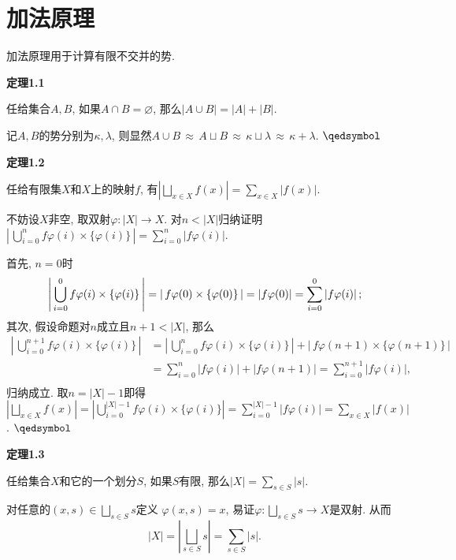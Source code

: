 \documentclass[UTF8]{ctexart}
\begin{document}
\setlength{\abovedisplayskip}{1pt}
\setlength{\belowdisplayskip}{1pt}

\section{加法原理}

加法原理用于计算有限不交并的势.

\vspace{10pt}

\hypertarget{sec:定理1.1}{}
\noindent\textbf{定理1.1}

任给集合$A,B$, 如果$A\cap B=\varnothing$, 那么$|A\cup B|=|A|+|B|$.


记$A,B$的势分别为$\kappa,\lambda$, 则显然$
A\cup B\,\approx\,A\sqcup B\,\approx\,\kappa\sqcup\lambda\,
\approx\,\kappa+\lambda$. \hfill $\qedsymbol$

\vspace{10pt}

\hypertarget{sec:定理1.2}{}
\noindent\textbf{定理1.2}

任给有限集$X$和$X$上的映射$f$, 有$\displaystyle
\left|\bigsqcup_{x\in X}f(x)\right|=\sum_{x\in X}|f(x)|$.


不妨设$X$非空, 取双射$\varphi:|X|\to X$. 对$n<|X|$归纳证明
$\displaystyle\left|\,\bigcup_{i=0}^nf\varphi(i)\times\{\varphi(i)\}\,\right|=
\sum_{i=0}^n|f\varphi(i)|$.

首先, $n=0$时
\[
    \left|\,\bigcup_{i=0}^0f\varphi(i)\times\{\varphi(i)\}\,\right|=
    |\,f\varphi(0)\times\{\varphi(0)\}\,|=|f\varphi(0)|=
    \sum_{i=0}^0|f\varphi(i)|\,;\\[5pt]
\]
其次, 假设命题对$n$成立且$n+1<|X|$, 那么
\vspace{3pt}
\[\begin{aligned}
    \left|\,\bigcup_{i=0}^{n+1}f\varphi(i)\times\{\varphi(i)\}\,\right|&=
    \left|\,\bigcup_{i=0}^nf\varphi(i)\times\{\varphi(i)\}\,\right|+
    |\,f\varphi(n+1)\times\{\varphi(n+1)\}\,|\\[3pt]&=
    \sum_{i=0}^n|f\varphi(i)|+|f\varphi(n+1)|=
    \sum_{i=0}^{n+1}|f\varphi(i)|,\\[6pt]
\end{aligned}\]
归纳成立. 取$n=|X|-1$即得$\displaystyle\left|\bigsqcup_{x\in X}f(x)\right|=
\left|\bigcup_{i=0}^{|X|-1}f\varphi(i)\times\{\varphi(i)\}\right|=
\sum_{i=0}^{|X|-1}|f\varphi(i)|=\sum_{x\in X}|f(x)|$. \hfill $\qedsymbol$

\vspace{13pt}

\hypertarget{sec:定理1.3}{}
\noindent\textbf{定理1.3}

任给集合$X$和它的一个划分$S$, 如果$S$有限, 那么$\displaystyle|X|=\sum_{s\in S}|s|$.


对任意的$\displaystyle(x,s)\in\bigsqcup_{s\in S}s$定义
$\varphi(x,s)=x$, 易证$\displaystyle\varphi:\bigsqcup_{s\in S}s\to X$是双射. 从而
\vspace{3pt}
\begin{equation*}
    |X|=\left|\bigsqcup_{s\in S}s\right|=\sum_{s\in S}|s|.
\tag*{\qedsymbol}\end{equation*}
\end{document}
